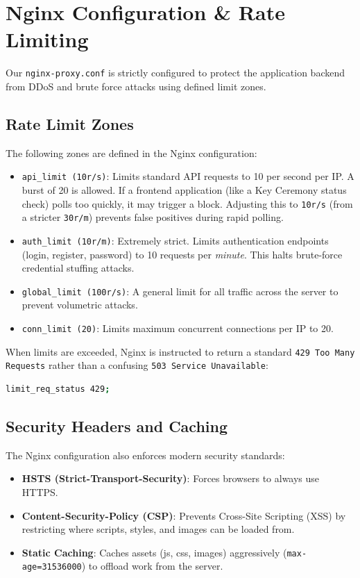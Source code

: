 \documentclass[12pt,a4paper]{article}
\begin{document}
\section{Nginx Configuration \& Rate Limiting}
Our \texttt{nginx-proxy.conf} is strictly configured to protect the application backend from DDoS and brute force attacks using defined limit zones. 

\subsection{Rate Limit Zones}
The following zones are defined in the Nginx configuration:
\begin{itemize}
    \item \texttt{api\_limit (10r/s)}: Limits standard API requests to 10 per second per IP. A burst of 20 is allowed. If a frontend application (like a Key Ceremony status check) polls too quickly, it may trigger a block. Adjusting this to \texttt{10r/s} (from a stricter \texttt{30r/m}) prevents false positives during rapid polling.
    \item \texttt{auth\_limit (10r/m)}: Extremely strict. Limits authentication endpoints (login, register, password) to 10 requests per \textit{minute}. This halts brute-force credential stuffing attacks.
    \item \texttt{global\_limit (100r/s)}: A general limit for all traffic across the server to prevent volumetric attacks.
    \item \texttt{conn\_limit (20)}: Limits maximum concurrent connections per IP to 20.
\end{itemize}

When limits are exceeded, Nginx is instructed to return a standard \texttt{429 Too Many Requests} rather than a confusing \texttt{503 Service Unavailable}:
\begin{lstlisting}[language=bash]
limit_req_status 429;
\end{lstlisting}

\subsection{Security Headers and Caching}
The Nginx configuration also enforces modern security standards:
\begin{itemize}
    \item \textbf{HSTS (Strict-Transport-Security)}: Forces browsers to always use HTTPS.
    \item \textbf{Content-Security-Policy (CSP)}: Prevents Cross-Site Scripting (XSS) by restricting where scripts, styles, and images can be loaded from.
    \item \textbf{Static Caching}: Caches assets (js, css, images) aggressively (\texttt{max-age=31536000}) to offload work from the server.
\end{itemize}
\end{document}
